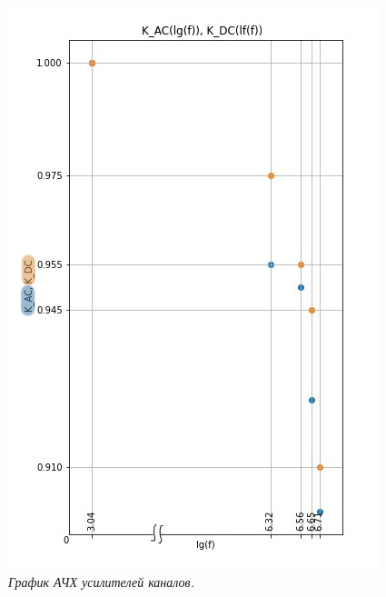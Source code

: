 \documentclass[a4paper,12pt]{report}
\begin{document}
{	\begin{figure}[h!]
	\begin{center}
	\includegraphics[scale=1]{lab116ris3.jpg}
	\caption{\textit{График АЧХ усилителей каналов.}}
	\end{center}
	\end{figure}
	
}
\end{document}
